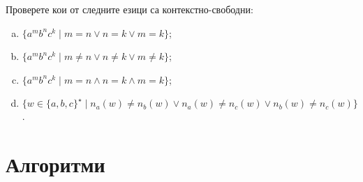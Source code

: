 
\begin{problem}
  Проверете кои от следните езици са контекстно-свободни:
  \begin{enumerate}[a)]
  \item
    $\{a^mb^nc^k\mid m = n \vee n = k \vee m = k\}$;
  \item
    $\{a^mb^nc^k\mid m \neq n \vee n \neq k \vee m \neq k\}$;
  \item
    $\{a^mb^nc^k\mid m = n \wedge n = k \wedge m = k\}$;
  \item
    $\{w \in \{a,b,c\}^\star\mid n_a(w) \neq n_b(w) \vee n_a(w) \neq n_c(w) \vee n_b(w) \neq n_c(w)\}$.
  \end{enumerate}
\end{problem}


\section{Алгоритми}

